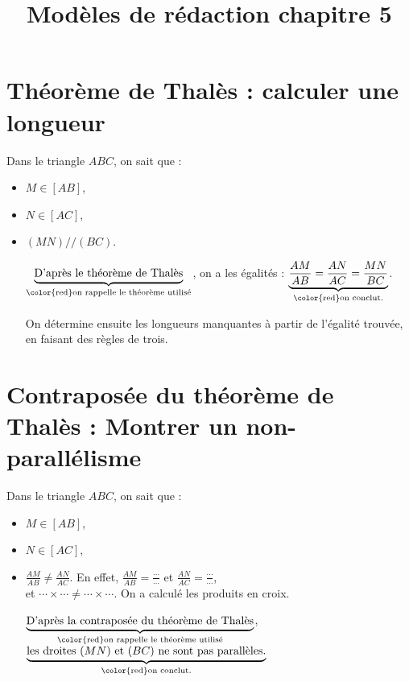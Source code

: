 \documentclass[14 pt, twoside]{extarticle}
\title{Modèles de rédaction chapitre 5}
\date{}
\theoremstyle{plain}
\begin{document}
	\maketitle
	
	
	\section{Théorème de Thalès : calculer une longueur}


Dans le triangle $ABC$, on sait que : 

\begin{itemize}
\item $M\in [AB]$, 
\item $N\in [AC]$, 
\item $(MN)//(BC)$. 

$\underbrace{\text{D'après le théorème de Thalès}}_{\text{\color{red}on rappelle le théorème utilisé}}$, on a les égalités : $\underbrace{\frac{AM}{AB} = \frac{AN}{AC} = \frac{MN}{BC}}_{\text{\color{red}on conclut}.}$. 

{\color{red}On détermine ensuite les longueurs manquantes à partir de l'égalité trouvée, en faisant des règles de trois.}
\end{itemize}

	
		
	\section{Contraposée du théorème de Thalès : Montrer un non-parallélisme}
	
	Dans le triangle $ABC$, on sait que :

\begin{itemize}
\item $M\in [AB]$, 
\item $N\in [AC]$, 
\item $\displaystyle \frac{AM}{AB}\neq \frac{AN}{AC}$. En effet, 
$\displaystyle\frac{AM}{AB} = \frac\cdots\cdots$ et $\displaystyle\frac{AN}{AC} = \frac\cdots\cdots$, \\et $\cdots \times \cdots \neq \cdots \times \cdots$. {\color{red} On a calculé les produits en croix.}

$\underbrace{\text{D'après la contraposée du théorème de Thalès}}_{\text{\color{red}on rappelle le théorème utilisé}}$,\\
 $\underbrace{\text{les droites $(MN)$ et $(BC)$ ne sont pas parallèles.}}_{\text{\color{red}on conclut}.}$ 

\end{itemize}
\newpage
	
\end{document}
